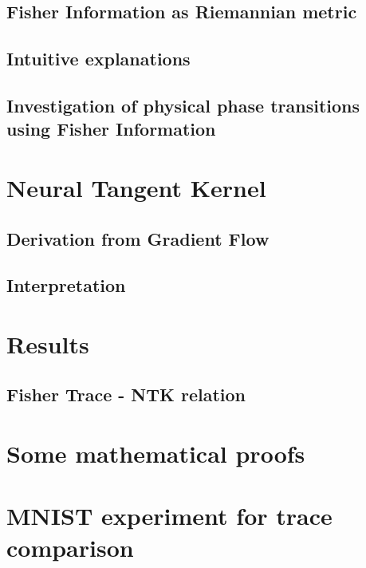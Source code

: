 \documentclass[12pt, a4paper]{report}
\begin{document}
	\section{Fisher Information as Riemannian metric}
	
	\section{Intuitive explanations}\label{sec:FisherInterpretation}
	
	\section{Investigation of physical phase transitions using Fisher Information}
	
	
	
	\chapter{Neural Tangent Kernel}
	\section{Derivation from Gradient Flow}
	
	\section{Interpretation}
	
	
	\chapter{Results}
	\section{Fisher Trace - NTK relation}
	
	
	
	
	\nocite{*}
	\printbibliography[title=Literature]
	\begin{appendices}
		\chapter{Some mathematical proofs}
		
		\chapter{MNIST experiment for trace comparison}
		\label{sec:TraceExperimentAppendix}
		
	\end{appendices}
	
\end{document}
